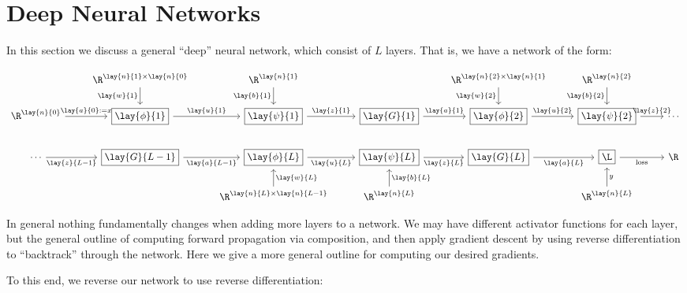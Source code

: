 


\section{Deep Neural Networks}

In this section we discuss a general ``deep'' neural network, which consist of $L$ layers.  That is, we have a network of the form:


{\tiny
\begin{equation*}
	\begin{tikzcd}
		{}
		&\R^{\lay{n}{1}\times\lay{n}{0}}
		\arrow[d, swap, "\lay{w}{1}"]
		&\R^{\lay{n}{1}}
		\arrow[d, swap, "\lay{b}{1}"]
		&{}
		&\R^{\lay{n}{2}\times\lay{n}{1}}
		\arrow[d, swap, "\lay{w}{2}"]
		&\R^{\lay{n}{2}}
		\arrow[d, swap, "\lay{b}{2}"]
		\\
		\R^{\lay{n}{0}}
		\arrow[r, "\lay{a}{0}:=x"]
		&\boxed{\lay{\phi}{1}}
		\arrow[r, "\lay{u}{1}"]
		&\boxed{\lay{\psi}{1}}
		\arrow[r, "\lay{z}{1}"]
		&\boxed{\lay{G}{1}}
		\arrow[r, "\lay{a}{1}"]
		&\boxed{\lay{\phi}{2}}
		\arrow[r, "\lay{u}{2}"]
		&\boxed{\lay{\psi}{2}}
		\arrow[r, "\lay{z}{2}"]
		&\cdots\\
		\cdots
		\arrow[r, swap, "\lay{z}{L-1}"]
		&\boxed{\lay{G}{L-1}}
		\arrow[r, swap, "\lay{a}{L-1}"]
		&\boxed{\lay{\phi}{L}}
		\arrow[r, swap, "\lay{u}{L}"]
		&\boxed{\lay{\psi}{L}}
		\arrow[r, swap, "\lay{z}{L}"]
		&\boxed{\lay{G}{L}}
		\arrow[r, swap, "\lay{a}{L}"]
		&\boxed{\L}
		\arrow[r, swap, "\text{loss}"]
		&\R
		\\
		{}
		&{}
		&\R^{\lay{n}{L}\times\lay{n}{L-1}}
		\arrow[u, swap, "\lay{w}{L}"]
		&\R^{\lay{n}{L}}
		\arrow[u, swap, "\lay{b}{L}"]
		&{}
		&\R^{\lay{n}{L}}
		\arrow[u, swap, "y"]
		&{}
	\end{tikzcd}
\end{equation*}
}


In general nothing fundamentally changes when adding more layers to a network.  We may have different activator functions for each layer, but the general outline of computing forward propagation via composition, and then apply gradient descent by using reverse differentiation to ``backtrack'' through the network.  Here we give a more general outline for computing our desired gradients.

To this end, we reverse our network to use reverse differentiation:

